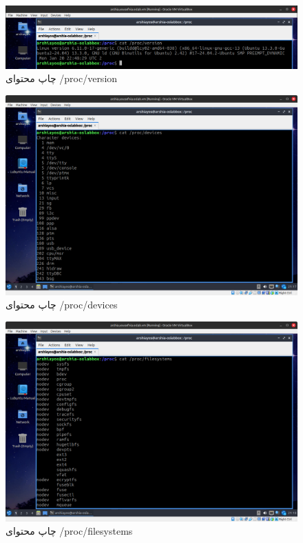 \documentclass[12pt]{article}
\begin{document}
	\begin{figure}[H]
		\centering
		\includegraphics[width=\textwidth]{report3-resources/2.png}
		\caption{چاپ محتوای \textenglish{/proc/version}}
		\label{fig:2}
	\end{figure}
	\begin{figure}[H]
		\centering
		\includegraphics[width=\textwidth]{report3-resources/3.png}
		\caption{چاپ محتوای \textenglish{/proc/devices}}
		\label{fig:3}
	\end{figure}
	\begin{figure}[H]
		\centering
		\includegraphics[width=\textwidth]{report3-resources/4.png}
		\caption{چاپ محتوای \textenglish{/proc/filesystems}}
		\label{fig:4}
	\end{figure}
\end{document}
